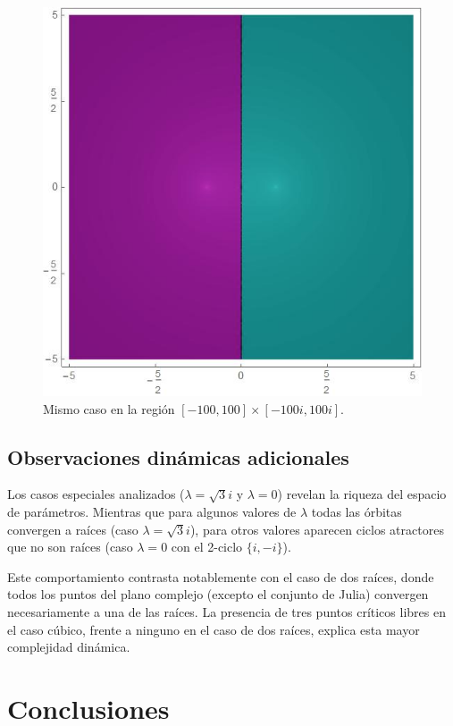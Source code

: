 \begin{figure}[H]
\begin{minipage}[b]{0.48\textwidth}
\includegraphics[width=\textwidth]{fuentes/articulo-cuadraticos/imagenes/newton_n_6_m_6.jpg}
\caption{Mismo caso en la región $[-100,100]\times[-100i,100i]$.}
\label{fig:cuenca_triangulo_2}
\end{minipage}
\end{figure}

\subsection{Observaciones dinámicas adicionales}

Los casos especiales analizados ($\lambda=\sqrt{3}i$ y $\lambda=0$) revelan la riqueza del espacio de parámetros. Mientras que para algunos valores de $\lambda$ todas las órbitas convergen a raíces (caso $\lambda=\sqrt{3}i$), para otros valores aparecen ciclos atractores que no son raíces (caso $\lambda=0$ con el 2-ciclo $\{i,-i\}$).

Este comportamiento contrasta notablemente con el caso de dos raíces, donde todos los puntos del plano complejo (excepto el conjunto de Julia) convergen necesariamente a una de las raíces. La presencia de tres puntos críticos libres en el caso cúbico, frente a ninguno en el caso de dos raíces, explica esta mayor complejidad dinámica.

\section{Conclusiones}

